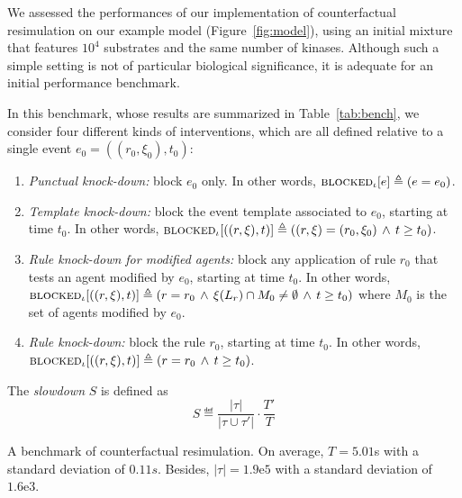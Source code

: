 
\newcommand{\subs}[2]{#1_{\textsf{#2}}}

We assessed the performances of our implementation of counterfactual
resimulation on our example model (Figure~\ref{fig:model}), using an
initial mixture that features $10^4$ substrates and the same number of
kinases.  Although such a simple setting is not of particular
biological significance, it is adequate for an initial performance
benchmark.

In this benchmark, whose results are summarized in
Table~\ref{tab:bench}, we consider four different kinds of
interventions, which are all defined relative to a single event
$e_0=((r_0, \xi_0), t_0)$:
\begin{enumerate}[leftmargin=0.4cm]
\item \textit{Punctual knock-down:} block $e_0$ only. In other words,
  ${\textsc{blocked}}_{\iota}[e] \triangleq (e = e_0)$.
\item \textit{Template knock-down:} block the event template
  associated to $e_0$, starting at time $t_0$. In other words,
  ${\textsc{blocked}}_{\iota}[((r, \xi), t)] \triangleq ((r, \xi) = (r_0, \xi_0)
  \,\wedge\, t \geq t_0)$.
\item \textit{Rule knock-down for modified agents:} block any
  application of rule $r_0$ that tests an agent modified by $e_0$,
  starting at time $t_0$. In other words,
  ${\textsc{blocked}}_{\iota}[((r, \xi), t)] \triangleq (r = r_0 \,\wedge\, \xi(L_r)
    \cap M_0 \neq \emptyset \,\wedge\, t \geq t_0)$ where $M_0$ is
  the set of agents modified by $e_0$.
\item \textit{Rule knock-down:} block the rule $r_0$, starting at time
  $t_0$. In other words,
  ${\textsc{blocked}}_{\iota}[((r, \xi), t)] \triangleq (r = r_0 \,\wedge\, t \geq
  t_0)$.
\end{enumerate}
The \emph{slowdown} $S$ is defined as
\[ S \eqdef \frac{|\tau|}{|\tau \cup \tau'|} \cdot \frac{T'}{T} \]


\begin{table}\footnotesize
  \begin{center}
    
  \end{center}
  \caption{A benchmark of counterfactual resimulation. On average,
    $T = 5.01$s with a standard deviation of $0.11s$. Besides,
    $|\tau| = 1.9\mathrm{e}5$ with a standard deviation of
    $1.6\mathrm{e}3$.}\label{tab:bench}
\end{table}
